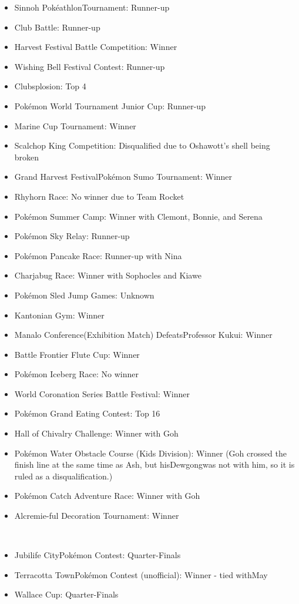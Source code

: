\documentclass[a4paper,12pt]{article}
\begin{document}
\begin{itemize}
\item Sinnoh PokéathlonTournament: Runner-up
\item Club Battle: Runner-up
\item Harvest Festival Battle Competition: Winner
\item Wishing Bell Festival Contest: Runner-up
\item Clubsplosion: Top 4
\item Pokémon World Tournament Junior Cup: Runner-up
\item Marine Cup Tournament: Winner
\item Scalchop King Competition: Disqualified due to Oshawott's shell being broken
\item Grand Harvest FestivalPokémon Sumo Tournament: Winner
\item Rhyhorn Race: No winner due to Team Rocket
\item Pokémon Summer Camp: Winner with Clemont, Bonnie, and Serena
\item Pokémon Sky Relay: Runner-up
\item Pokémon Pancake Race: Runner-up with Nina
\item Charjabug Race: Winner with Sophocles and Kiawe
\item Pokémon Sled Jump Games: Unknown
\item Kantonian Gym: Winner
\item Manalo Conference(Exhibition Match) DefeatsProfessor Kukui: Winner
\item Battle Frontier Flute Cup: Winner
\item Pokémon Iceberg Race: No winner
\item World Coronation Series Battle Festival: Winner
\item Pokémon Grand Eating Contest: Top 16
\item Hall of Chivalry Challenge: Winner with Goh
\item Pokémon Water Obstacle Course (Kids Division): Winner (Goh crossed the finish line at the same time as Ash, but hisDewgongwas not with him, so it is ruled as a disqualification.)
\item Pokémon Catch Adventure Race: Winner with Goh
\item Alcremie-ful Decoration Tournament: Winner
\end{itemize}\\ \par \vspace{0.5cm}

\begin{itemize}
\item Jubilife CityPokémon Contest: Quarter-Finals
\item Terracotta TownPokémon Contest (unofficial): Winner - tied withMay
\item Wallace Cup: Quarter-Finals
\end{itemize}\\ \par \vspace{0.5cm}
\end{document}
